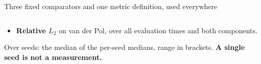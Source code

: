 \documentclass[aspectratio=169,10pt]{beamer}
\newcommand{\hl}[1]{{\color{accent}\textbf{#1}}}
\begin{document}
\begin{frame}[shrink=25]{Three fixed comparators and one metric definition, used everywhere}
\begin{columns}[T]
\begin{column}{0.48\textwidth}
\begin{itemize}
\[                 \frac{\lVert S_{\mathrm{ref}} - S_{\mathrm{pred}} \rVert^2}
                      {\lVert S_{\mathrm{ref}} \rVert^2}\right). \]
              The cap exists because the denominator can approach zero, and a
              miss larger than the state carries no more information than
              ``completely wrong''.
        \item \textbf{Relative $L_2$} on van der Pol, over all evaluation times
              and both components.
      \end{itemize}
      \smallskip
      {\small Over seeds: the median of the per-seed medians, range in brackets.
       \hl{A single seed is not a measurement.}}
    \end{column}
  \end{columns}
\end{frame}

\end{document}
